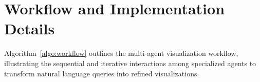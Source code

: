 

\section{\methodname{} Workflow and Implementation Details}

Algorithm~\ref{algo:workflow} outlines the \methodname{} multi-agent visualization workflow, illustrating the sequential and iterative interactions among specialized agents to transform natural language queries into refined visualizations.







